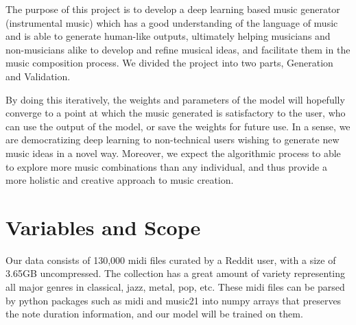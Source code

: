 \documentclass[12pt,oneside]{chicagocapstone}
\begin{document}
The purpose of this project is to develop a deep learning based music generator (instrumental music) which has a good understanding of the language of music and is able to generate human-like outputs, ultimately helping musicians and non-musicians alike to develop and refine musical ideas, and facilitate them in the music composition process. We divided the project into two parts, Generation and Validation.

By doing this iteratively, the weights and parameters of the model will hopefully converge to a point at which the music generated is satisfactory to the user, who can use the output of the model, or save the weights for future use. In a sense, we are democratizing deep learning to non-technical users wishing to generate new music ideas in a novel way. Moreover, we expect the algorithmic process to able to explore more music combinations than any individual, and thus provide a more holistic and creative approach to music creation.

\hypertarget{variables-and-scope}{%
\section*{Variables and Scope}\label{variables-and-scope}}

Our data consists of 130,000 midi files curated by a Reddit user, with a size of 3.65GB uncompressed. The collection has a great amount of variety representing all major genres in classical, jazz, metal, pop, etc. These midi files can be parsed by python packages such as midi and music21 into numpy arrays that preserves the note duration information, and our model will be trained on them.
\end{document}
